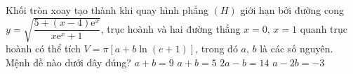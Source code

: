 \begin{ex}%
	Khối tròn xoay tạo thành khi quay hình phẳng $ (H) $ giới hạn bởi đường cong $ y=\sqrt{\dfrac{5+(x-4)\mathrm{e}^x}{x\mathrm{e}^x+1}} $, trục hoành và hai đường thẳng $ x=0 $, $ x=1 $ quanh trục hoành có thể tích $ V=\pi[a+b\ln (e+1)] $, trong đó $ a $, $ b $ là các số nguyên. Mệnh đề nào dưới đây đúng?
	\choice
	{$ a+b=9 $}
	{$ a+b=5 $}
	{\True $ 2a-b=14 $}
	{$ a-2b=-3 $}
\end{ex}

